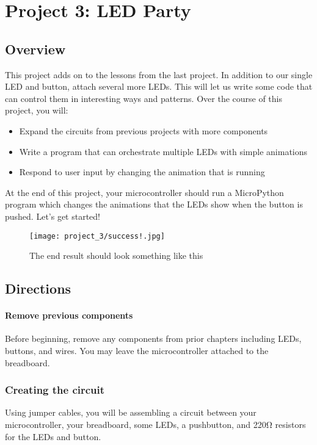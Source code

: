 \chapter{Project 3: LED Party}

\section{Overview}
This project adds on to the lessons from the last project. In addition to our single LED and button,
attach several more LEDs. This will let us write some code that can control them in interesting ways
and patterns. Over the course of this project, you will:
\begin{itemize}
    \item Expand the circuits from previous projects with more components
    \item Write a program that can orchestrate multiple LEDs with simple animations
    \item Respond to user input by changing the animation that is running
\end{itemize}
At the end of this project, your microcontroller should run a MicroPython program which changes the
animations that the LEDs show when the button is pushed. Let's get started!
\begin{figure}[H]
\centering
    \texttt{[image: project\_3/success!.jpg]}
    \caption{The end result should look something like this}
\end{figure}

\pagebreak

\section{Directions}

\subsubsection{Remove previous components}
Before beginning, remove any components from prior chapters including LEDs, buttons, and wires. You may leave the
microcontroller attached to the breadboard.

\subsection{Creating the circuit}
Using jumper cables, you will be assembling a circuit between your microcontroller, your breadboard,
some LEDs, a pushbutton, and 220\si{\ohm} resistors for the LEDs and button.

